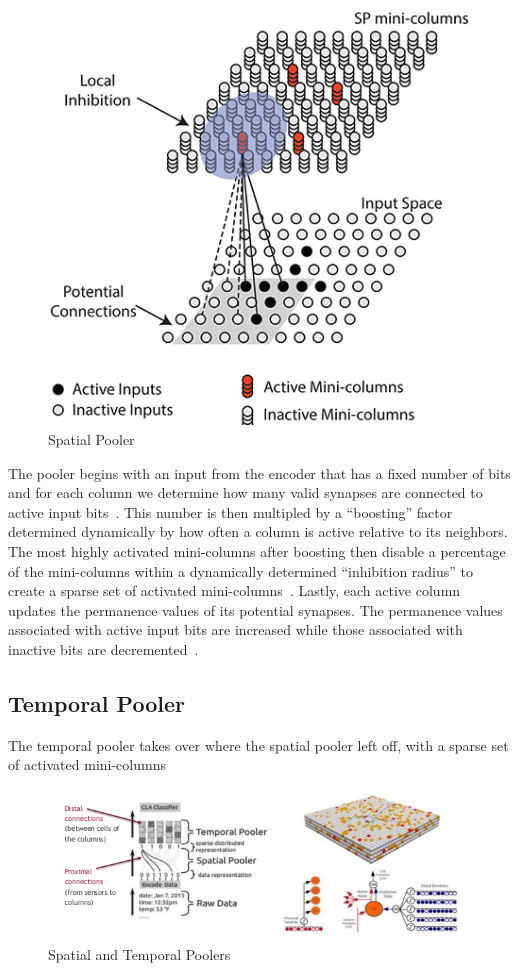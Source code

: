 \documentclass[oneside,12pt,openany]{book}
\begin{document}
	\begin{figure}[!ht]
		\centering
		\includegraphics[width=.6\linewidth]{images/SpatialPooler.jpg}
		\caption[Spatial Pooler]{Spatial Pooler \cite{TheHTMSpatialPooler}}
		\label{fig:SpatialPooler}
	\end{figure}

	
	The pooler begins with an input from the encoder that has a fixed number of bits and for each column we determine how many valid synapses are connected to active input bits~\cite{Whitepaper}. This number is then multipled by a ``boosting'' factor determined dynamically by how often a column is active relative to its neighbors. The most highly activated mini-columns after boosting then disable a percentage of the mini-columns within a dynamically determined ``inhibition radius'' to create a sparse set of activated mini-columns~\cite{Whitepaper}. Lastly, each active column updates the permanence values of its potential synapses. The permanence values associated with active input bits are increased while those associated with inactive bits are decremented~\cite{Whitepaper}.

	
	\subsection{Temporal Pooler}

	The temporal pooler takes over where the spatial pooler left off, with a sparse set of activated mini-columns

	\begin{figure}[!ht]
		\centering
		\includegraphics[width=\linewidth]{images/Poolers.jpg}
		\caption{Spatial and Temporal Poolers}
		\label{fig:Poolers}
	\end{figure}
\end{document}

